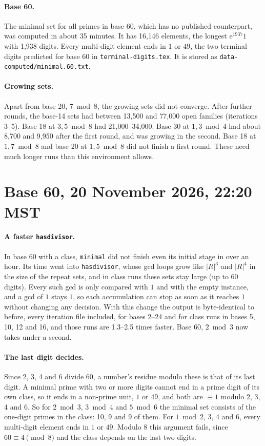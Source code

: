 \documentclass[11pt]{article}
\newcommand{\code}[1]{\texttt{#1}}
\begin{document}
\paragraph{Base 60.} The minimal set for all primes in base 60, which has no published counterpart, was computed in about 35 minutes. It has 16{,}146 elements, the longest $\mathrm{e}^{1937}1$ with 1{,}938 digits. Every multi-digit element ends in $1$ or $49$, the two terminal digits predicted for base 60 in \code{terminal-digits.tex}. It is stored as \code{data-computed/minimal.60.txt}.

\paragraph{Growing sets.} Apart from base 20, $7 \bmod 8$, the growing sets did not converge. After further rounds, the base-14 sets had between 13{,}500 and 77{,}000 open families (iterations 3--5). Base 18 at $3, 5 \bmod 8$ had 21{,}000--34{,}000. Base 30 at $1, 3 \bmod 4$ had about 8{,}700 and 9{,}950 after the first round, and was growing in the second. Base 18 at $1, 7 \bmod 8$ and base 20 at $1, 5 \bmod 8$ did not finish a first round. These need much longer runs than this environment allows.

\section{Base 60, 20 November 2026, 22:20 MST}\label{sec:base60}

\paragraph{A faster \code{hasdivisor}.} In base 60 with a class, \code{minimal} did not finish even its initial stage in over an hour. Its time went into \code{hasdivisor}, whose gcd loops grow like $|R|^3$ and $|R|^4$ in the size of the repeat sets, and in class runs these sets stay large (up to 60 digits). Every such gcd is only compared with $1$ and with the empty instance, and a gcd of $1$ stays $1$, so each accumulation can stop as soon as it reaches $1$ without changing any decision. With this change the output is byte-identical to before, every iteration file included, for bases 2--24 and for class runs in bases 5, 10, 12 and 16, and those runs are 1.3--2.5 times faster. Base 60, $2 \bmod 3$ now takes under a second.

\paragraph{The last digit decides.} Since 2, 3, 4 and 6 divide 60, a number's residue modulo these is that of its last digit. A minimal prime with two or more digits cannot end in a prime digit of its own class, so it ends in a non-prime unit, $1$ or $49$, and both are $\equiv 1$ modulo 2, 3, 4 and 6. So for $2 \bmod 3$, $3 \bmod 4$ and $5 \bmod 6$ the minimal set consists of the one-digit primes in the class: 10, 9 and 9 of them. For $1 \bmod 2$, $3$, $4$ and $6$, every multi-digit element ends in $1$ or $49$. Modulo 8 this argument fails, since $60\equiv 4 \pmod 8$ and the class depends on the last two digits.
\end{document}
